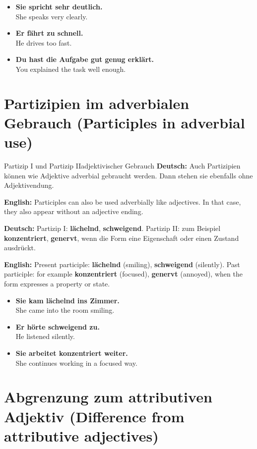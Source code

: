 \documentclass[a4paper,11pt]{article}
\newcommand{\GermanText}[1]{\textbf{Deutsch: }#1\par}
\newcommand{\EnglishText}[1]{{\small\color{SoftGray}\textbf{English: }#1\par}}
\newcommand{\ExampleItem}[2]{\item \textbf{#1}\\{\small\color{SoftGray}#2}}
\begin{document}
        \begin{exbox}
            \begin{itemize}
                \ExampleItem{Sie spricht sehr deutlich.}{She speaks very clearly.}
                \ExampleItem{Er fährt zu schnell.}{He drives too fast.}
                \ExampleItem{Du hast die Aufgabe gut genug erklärt.}{You explained the task well enough.}
            \end{itemize}
        \end{exbox}

    \section{Partizipien im adverbialen Gebrauch \textnormal{(Participles in adverbial use)}}

        \begin{grammarentry}{Partizip I und Partizip II}{adjektivischer Gebrauch}
            \GermanText{Auch Partizipien können wie Adjektive adverbial gebraucht werden. Dann stehen sie ebenfalls ohne Adjektivendung.}
            \EnglishText{Participles can also be used adverbially like adjectives. In that case, they also appear without an adjective ending.}

            \GermanText{Partizip I: \textbf{lächelnd}, \textbf{schweigend}. Partizip II: zum Beispiel \textbf{konzentriert}, \textbf{genervt}, wenn die Form eine Eigenschaft oder einen Zustand ausdrückt.}
            \EnglishText{Present participle: \textbf{lächelnd} (smiling), \textbf{schweigend} (silently). Past participle: for example \textbf{konzentriert} (focused), \textbf{genervt} (annoyed), when the form expresses a property or state.}
        \end{grammarentry}

        \begin{exbox}
            \begin{itemize}
                \ExampleItem{Sie kam lächelnd ins Zimmer.}{She came into the room smiling.}
                \ExampleItem{Er hörte schweigend zu.}{He listened silently.}
                \ExampleItem{Sie arbeitet konzentriert weiter.}{She continues working in a focused way.}
            \end{itemize}
        \end{exbox}

    \section{Abgrenzung zum attributiven Adjektiv \textnormal{(Difference from attributive adjectives)}}
\end{document}

